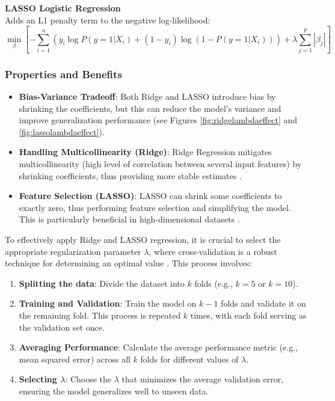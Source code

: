 \documentclass[english,11pt,a4paper,titlepage]{article}
\begin{document}
	\noindent
	\textbf{LASSO Logistic Regression} \\
	Adds an L1 penalty term to the negative log-likelihood:
	\begin{equation*}
		\min_{\beta} \left[ -\sum_{i=1}^{n} \left( y_i \log P(y=1|X_i) + (1-y_i) \log (1 - P(y=1|X_i)) \right) + \lambda \sum_{j=1}^{p}|\beta_{j}| \right]
	\end{equation*}
	
	\subsubsection*{Properties and Benefits}
	\begin{itemize}
		\item \textbf{Bias-Variance Tradeoff}: Both Ridge and LASSO introduce bias by shrinking the coefficients, but this can reduce the model's variance and improve generalization performance \cite{sohilIntroductionStatisticalLearning2022} (see Figures \ref{fig:ridgelambdaeffect} and \ref{fig:lassolambdaeffect}).
		\item \textbf{Handling Multicollinearity (Ridge)}: Ridge Regression mitigates multicollinearity (high level of correlation between several input features) by shrinking coefficients, thus providing more stable estimates \cite{hoerlRidgeRegressionBiased1970,marquardtRidgeRegressionPractice1975}.
		\item \textbf{Feature Selection (LASSO)}: LASSO can shrink some coefficients to exactly zero, thus performing feature selection and simplifying the model. This is particularly beneficial in high-dimensional datasets \cite{tibshiraniRegressionShrinkageSelection1996}.
	\end{itemize}
	
	To effectively apply Ridge and LASSO regression, it is crucial to select the appropriate regularization parameter \( \lambda \), where cross-validation is a robust technique for determining an optimal value \cite{sohilIntroductionStatisticalLearning2022}. This process involves:
	\begin{enumerate}
		\item \textbf{Splitting the data}: Divide the dataset into \( k \) folds (e.g., \( k = 5 \) or \( k = 10 \)).
		\item \textbf{Training and Validation}: Train the model on \( k - 1 \) folds and validate it on the remaining fold. This process is repeated \( k \) times, with each fold serving as the validation set once.
		\item \textbf{Averaging Performance}: Calculate the average performance metric (e.g., mean squared error) across all \( k \) folds for different values of \( \lambda \).
		\item \textbf{Selecting \( \lambda \)}: Choose the \( \lambda \) that minimizes the average validation error, ensuring the model generalizes well to unseen data.
	\end{enumerate}
	
\end{document}
